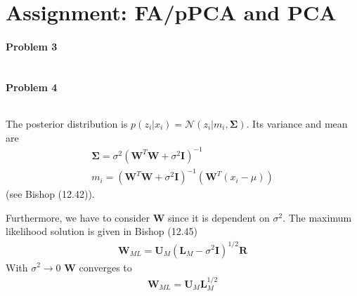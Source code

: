 \documentclass{article}
\newcommand{\Mtx}[1]{\ensuremath{\mathbf{#1}}}
\begin{document}
\section{Assignment: FA/pPCA and PCA}
\paragraph*{Problem 3}
$\;$



\paragraph*{Problem 4}
$\;$ 

The posterior distribution is $p(z_i|x_i) = \mathcal{N}(z_i|m_i, \Mtx{\Sigma})$. Its variance and mean are
\begin{eqnarray}
\Mtx{\Sigma} = \sigma^2 (\Mtx{W}^T\Mtx{W}+\sigma^2\Mtx{I})^{-1}\\
m_i = (\Mtx{W}^T\Mtx{W} + \sigma^2\Mtx{I})^{-1} (\Mtx{W}^T (x_i-\mu))
\end{eqnarray}
(see Bishop (12.42)).

Furthermore, we have to consider $\Mtx{W}$ since it is dependent on $\sigma^2$.
The maximum likelihood solution is given in Bishop (12.45)
\begin{eqnarray}
\Mtx{W}_{ML} = \Mtx{U}_M(\Mtx{L}_M-\sigma^2\Mtx{I})^{1/2}\Mtx{R}
\end{eqnarray}
With $\sigma^2 \rightarrow 0$ $\Mtx{W}$ converges to
\begin{eqnarray}
\Mtx{W}_{ML} = \Mtx{U}_M \Mtx{L}_M^{1/2}
\end{eqnarray}
\end{document}
